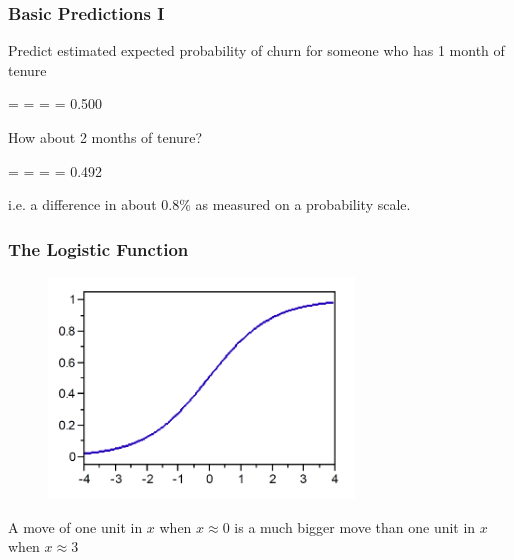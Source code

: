 \documentclass[handout]{beamer}
\begin{document}
\begin{frame}\frametitle{Basic Predictions I}

Predict estimated expected probability of churn for someone who has 1 month of tenure

\beqn
\phat =  =  =  = 0.500
\eeqn

How about 2 months of tenure?

\beqn
\phat =  =  =  = 0.492
\eeqn

i.e. a difference in about 0.8\% as measured on a probability scale.

\end{frame}

\begin{frame}\frametitle{The Logistic Function}

\begin{figure}
\centering
\includegraphics[width=3.2in]{logistic_function.png}
\end{figure}

A move of one unit in $x$ when $x \approx 0$ is a much bigger move than one unit in $x$ when $x \approx 3$

\end{frame}
\end{document}
